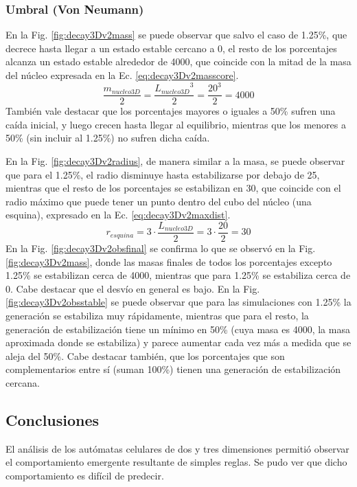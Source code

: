 \subsubsection{Umbral (Von Neumann)}
En la Fig. \ref{fig:decay3Dv2mass} se puede observar que salvo el caso de 1.25\%, que decrece hasta llegar a un estado estable cercano a 0, el resto de los porcentajes alcanza un estado estable alrededor de 4000, que coincide con la mitad de la masa del núcleo expresada en la Ec. \ref{eq:decay3Dv2masscore}.
\begin{equation}
    \label{eq:decay3Dv2masscore}
    \frac{m_{nucleo3D}}{2} = \frac{{L_{nucleo3D}}^3}{2} = \frac{20^3}{2} = 4000
\end{equation}
También vale destacar que los porcentajes mayores o iguales a 50\% sufren una caída inicial, y luego crecen hasta llegar al equilibrio, mientras que los menores a 50\% (sin incluir al 1.25\%) no sufren dicha caída.


En la Fig. \ref{fig:decay3Dv2radius}, de manera similar a la masa, se puede observar que para el 1.25\%, el radio disminuye hasta estabilizarse por debajo de 25, mientras que el resto de los porcentajes se estabilizan en 30, que coincide con el radio máximo que puede tener un punto dentro del cubo del núcleo (una esquina), expresado en la Ec. \ref{eq:decay3Dv2maxdist}.
\begin{equation}
    \label{eq:decay3Dv2maxdist}
    r_{esquina} = 3 \cdot \frac{L_{nucleo3D}}{2} = 3 \cdot \frac{20}{2} = 30
\end{equation}
En la Fig. \ref{fig:decay3Dv2obsfinal} se confirma lo que se observó en la Fig. \ref{fig:decay3Dv2mass}, donde las masas finales de todos los porcentajes excepto 1.25\% se estabilizan cerca de 4000, mientras que para 1.25\% se estabiliza cerca de 0. Cabe destacar que el desvío en general es bajo.
En la Fig. \ref{fig:decay3Dv2obsstable} se puede observar que para las simulaciones con 1.25\% la generación se estabiliza muy rápidamente, mientras que para el resto, la generación de estabilización tiene un mínimo en 50\% (cuya masa es 4000, la masa aproximada donde se estabiliza) y parece aumentar cada vez más a medida que se aleja del 50\%. Cabe destacar también, que los porcentajes que son complementarios entre sí (suman 100\%) tienen una generación de estabilización cercana.

\subsection{Conclusiones}
\label{subsec:conclusiones}
El análisis de los autómatas celulares de dos y tres dimensiones permitió observar el comportamiento emergente resultante de simples reglas.
Se pudo ver que dicho comportamiento es difícil de predecir.

